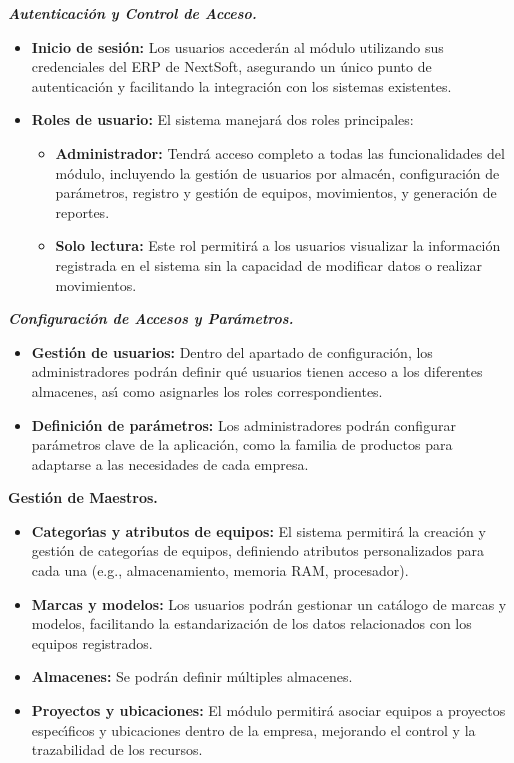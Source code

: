 \documentclass[stu, 12pt, letterpaper, donotrepeattitle, floatsintext, natbib]{apa7}
\begin{document}
\textit{\textbf{Autenticaci\'on y Control de Acceso.}}
\begin{itemize}
    \item\textbf{Inicio de sesi\'on: }Los usuarios acceder\'an al m\'odulo utilizando sus credenciales del ERP de NextSoft, asegurando un \'unico punto de autenticaci\'on y facilitando la integraci\'on con los sistemas existentes.
    \item\textbf{Roles de usuario: }El sistema manejar\'a dos roles principales:
          \begin{itemize}
              \item\textbf{Administrador: }Tendr\'a acceso completo a todas las funcionalidades del m\'odulo, incluyendo la gesti\'on de usuarios por almac\'en, configuraci\'on de par\'ametros, registro y gesti\'on de equipos, movimientos, y generaci\'on de reportes.
              \item\textbf{Solo lectura: }Este rol permitir\'a a los usuarios visualizar la informaci\'on registrada en el sistema sin la capacidad de modificar datos o realizar movimientos.
          \end{itemize}
\end{itemize}

\textit{\textbf{Configuraci\'on de Accesos y Par\'ametros.}}
\begin{itemize}
    \item\textbf{Gesti\'on de usuarios: }Dentro del apartado de configuraci\'on, los administradores podr\'an definir qu\'e usuarios tienen acceso a los diferentes almacenes, as\'{\i} como asignarles los roles correspondientes.
    \item\textbf{Definici\'on de par\'ametros: }Los administradores podr\'an configurar par\'ametros clave de la aplicaci\'on, como la familia de productos para adaptarse a las necesidades de cada empresa.
\end{itemize}

\textbf{Gesti\'on de Maestros.}
\begin{itemize}
    \item\textbf{Categor\'{\i}as y atributos de equipos: }El sistema permitir\'a la creaci\'on y gesti\'on de categor\'{\i}as de equipos, definiendo atributos personalizados para cada una (e.g., almacenamiento, memoria RAM, procesador).
    \item\textbf{Marcas y modelos: }Los usuarios podr\'an gestionar un cat\'alogo de marcas y modelos, facilitando la estandarizaci\'on de los datos relacionados con los equipos registrados.
    \item\textbf{Almacenes: }Se podr\'an definir m\'ultiples almacenes.
    \item\textbf{Proyectos y ubicaciones: }El m\'odulo permitir\'a asociar equipos a proyectos espec\'{\i}ficos y ubicaciones dentro de la empresa, mejorando el control y la trazabilidad de los recursos.
\end{itemize}
\end{document}
